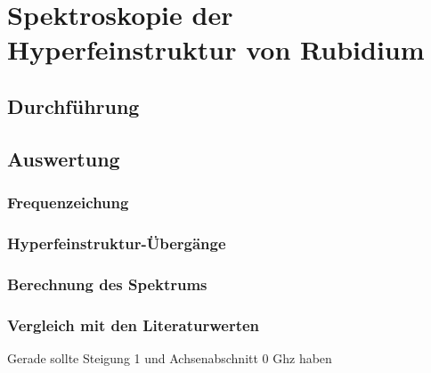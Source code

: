 \section{Spektroskopie der Hyperfeinstruktur von Rubidium}
\subsection{Durchführung}
\subsection{Auswertung}
\subsubsection*{Frequenzeichung}
\subsubsection*{Hyperfeinstruktur-Übergänge}
\subsubsection*{Berechnung des Spektrums}
\subsubsection*{Vergleich mit den Literaturwerten}
Gerade sollte Steigung 1 und Achsenabschnitt 0 Ghz haben
